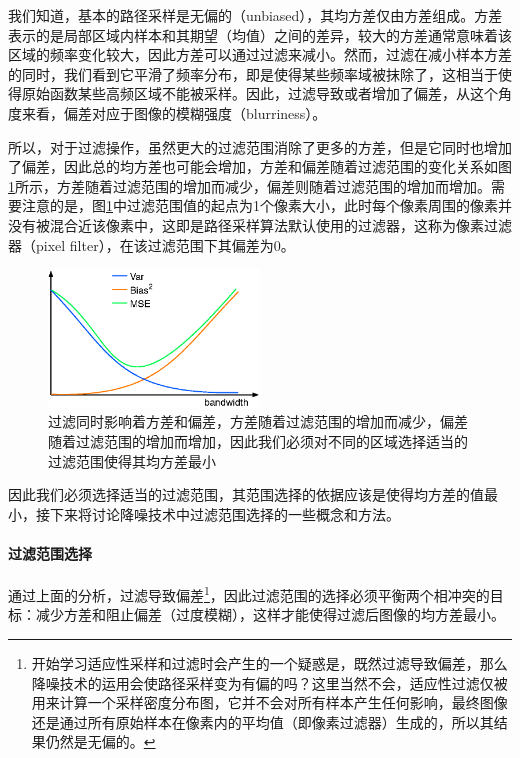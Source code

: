 我们知道，基本的路径采样是无偏的（unbiased），其均方差仅由方差组成。方差表示的是局部区域内样本和其期望（均值）之间的差异，较大的方差通常意味着该区域的频率变化较大，因此方差可以通过过滤来减小。然而，过滤在减小样本方差的同时，我们看到它平滑了频率分布，即是使得某些频率域被抹除了，这相当于使得原始函数某些高频区域不能被采样。因此，过滤导致或者增加了偏差，从这个角度来看，偏差对应于图像的模糊强度（blurriness）。

所以，对于过滤操作，虽然更大的过滤范围消除了更多的方差，但是它同时也增加了偏差，因此总的均方差也可能会增加，方差和偏差随着过滤范围的变化关系如图\ref{f:pt-var-and-bias}所示，方差随着过滤范围的增加而减少，偏差则随着过滤范围的增加而增加。需要注意的是，图\ref{f:pt-var-and-bias}中过滤范围值的起点为1个像素大小，此时每个像素周围的像素并没有被混合近该像素中，这即是路径采样算法默认使用的过滤器，这称为像素过滤器（pixel filter），在该过滤范围下其偏差为0。

\begin{figure}
	\sidecaption
	\includegraphics[width=0.5\textwidth]{figures/pt/var-and-bias.eps}
	\caption{过滤同时影响着方差和偏差，方差随着过滤范围的增加而减少，偏差随着过滤范围的增加而增加，因此我们必须对不同的区域选择适当的过滤范围使得其均方差最小}
	\label{f:pt-var-and-bias}
\end{figure}

因此我们必须选择适当的过滤范围，其范围选择的依据应该是使得均方差的值最小，接下来将讨论降噪技术中过滤范围选择的一些概念和方法。





\paragraph{过滤范围选择}
通过上面的分析，过滤导致偏差\footnote{开始学习适应性采样和过滤时会产生的一个疑惑是，既然过滤导致偏差，那么降噪技术的运用会使路径采样变为有偏的吗？这里当然不会，适应性过滤仅被用来计算一个采样密度分布图，它并不会对所有样本产生任何影响，最终图像还是通过所有原始样本在像素内的平均值（即像素过滤器）生成的，所以其结果仍然是无偏的。}，因此过滤范围的选择必须平衡两个相冲突的目标：减少方差和阻止偏差（过度模糊），这样才能使得过滤后图像的均方差最小。

